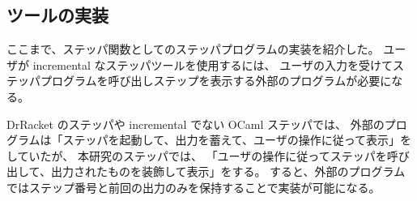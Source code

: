 \subsection{ツールの実装}

ここまで、ステッパ関数としてのステッパプログラムの実装を紹介した。
ユーザが incremental なステッパツールを使用するには、
ユーザの入力を受けてステッパプログラムを呼び出しステップを表示する外部のプログラムが必要になる。

DrRacket のステッパ\cite{clements01}や incremental でない OCaml ステッパでは、
外部のプログラムは「ステッパを起動して、出力を蓄えて、ユーザの操作に従って表示」をしていたが、
本研究のステッパでは、
「ユーザの操作に従ってステッパを呼び出して、出力されたものを装飾して表示」をする。
すると、外部のプログラムではステップ番号と前回の出力のみを保持することで実装が可能になる。
